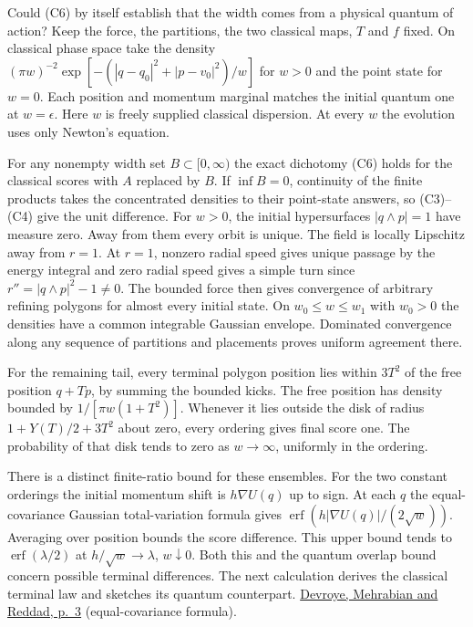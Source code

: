 \documentclass[11pt,a4paper]{article}
\begin{document}
Could (C6) by itself establish that the width comes from a physical
quantum of action? Keep the force, the partitions, the two classical
maps, \(T\) and \(f\) fixed. On classical phase space take the density
\((\pi w)^{-2}\exp[-(|q-q_0|^2+|p-v_0|^2)/w]\) for \(w>0\) and the point
state for \(w=0\). Each position and momentum marginal matches the
initial quantum one at \(w=\epsilon\). Here \(w\) is freely supplied
classical dispersion. At every \(w\) the evolution uses only Newton's
equation.

For any nonempty width set \(B\subset[0,\infty)\) the exact dichotomy
(C6) holds for the classical scores with \(A\) replaced by \(B\). If
\(\inf B=0\), continuity of the finite products takes the concentrated
densities to their point-state answers, so (C3)--(C4) give the unit
difference. For \(w>0\), the initial hypersurfaces \(|q\wedge p|=1\)
have measure zero. Away from them every orbit is unique. The field is
locally Lipschitz away from \(r=1\). At \(r=1\), nonzero radial speed
gives unique passage by the energy integral and zero radial speed gives
a simple turn since \(r''=|q\wedge p|^2-1\ne0\). The bounded force then
gives convergence of arbitrary refining polygons for almost every
initial state. On \(w_0\le w\le w_1\) with \(w_0>0\) the densities have
a common integrable Gaussian envelope. Dominated convergence along any
sequence of partitions and placements proves uniform agreement there.

For the remaining tail, every terminal polygon position lies within
\(3T^2\) of the free position \(q+Tp\), by summing the bounded kicks.
The free position has density bounded by \(1/[\pi w(1+T^2)]\). Whenever
it lies outside the disk of radius \(1+Y(T)/2+3T^2\) about zero, every
ordering gives final score one. The probability of that disk tends to
zero as \(w\to\infty\), uniformly in the ordering.

There is a distinct finite-ratio bound for these ensembles. For the two
constant orderings the initial momentum shift is \(h\nabla U(q)\) up to
sign. At each \(q\) the equal-covariance Gaussian total-variation
formula gives \(\operatorname{erf}(h|\nabla U(q)|/(2\sqrt w))\).
Averaging over position bounds the score difference. This upper bound
tends to \(\operatorname{erf}(\lambda/2)\) at \(h/\sqrt w\to\lambda\),
\(w\downarrow0\). Both this and the quantum overlap bound concern
possible terminal differences. The next calculation derives the
classical terminal law and sketches its quantum counterpart.
\href{https://arxiv.org/pdf/1810.08693\#page=3}{Devroye, Mehrabian and
Reddad, p.~3} (equal-covariance formula).
\end{document}
